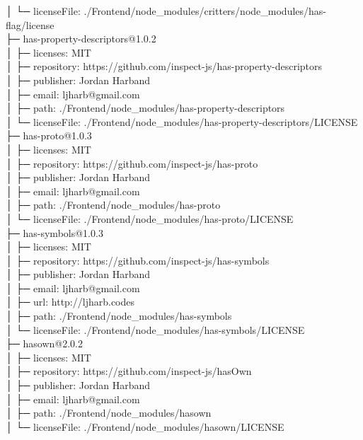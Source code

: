 \documentclass[
    paper=a4,
    twoside=false,
    parskip=half,
    listof=entryprefix,
    listof=totoc,
    index=totoc,
    bibliography=totoc,
    headsepline,
]{scrbook}
\begin{document}
    │  └─ licenseFile: ./Frontend/node\_modules/critters/node\_modules/has-flag/license\\
    ├─ has-property-descriptors@1.0.2\\
    │  ├─ licenses: MIT\\
    │  ├─ repository: https://github.com/inspect-js/has-property-descriptors\\
    │  ├─ publisher: Jordan Harband\\
    │  ├─ email: ljharb@gmail.com\\
    │  ├─ path: ./Frontend/node\_modules/has-property-descriptors\\
    │  └─ licenseFile: ./Frontend/node\_modules/has-property-descriptors/LICENSE\\
    ├─ has-proto@1.0.3\\
    │  ├─ licenses: MIT\\
    │  ├─ repository: https://github.com/inspect-js/has-proto\\
    │  ├─ publisher: Jordan Harband\\
    │  ├─ email: ljharb@gmail.com\\
    │  ├─ path: ./Frontend/node\_modules/has-proto\\
    │  └─ licenseFile: ./Frontend/node\_modules/has-proto/LICENSE\\
    ├─ has-symbols@1.0.3\\
    │  ├─ licenses: MIT\\
    │  ├─ repository: https://github.com/inspect-js/has-symbols\\
    │  ├─ publisher: Jordan Harband\\
    │  ├─ email: ljharb@gmail.com\\
    │  ├─ url: http://ljharb.codes\\
    │  ├─ path: ./Frontend/node\_modules/has-symbols\\
    │  └─ licenseFile: ./Frontend/node\_modules/has-symbols/LICENSE\\
    ├─ hasown@2.0.2\\
    │  ├─ licenses: MIT\\
    │  ├─ repository: https://github.com/inspect-js/hasOwn\\
    │  ├─ publisher: Jordan Harband\\
    │  ├─ email: ljharb@gmail.com\\
    │  ├─ path: ./Frontend/node\_modules/hasown\\
    │  └─ licenseFile: ./Frontend/node\_modules/hasown/LICENSE\\
\end{document}
